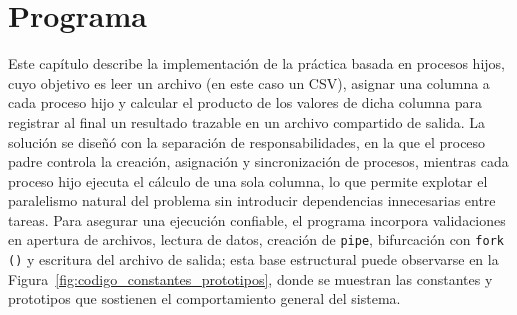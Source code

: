 %


\chapter{Programa}


Este capítulo describe la implementación de la práctica basada en procesos hijos, cuyo objetivo es leer un archivo (en este caso un CSV), asignar una columna a cada proceso hijo y calcular el producto de los valores de dicha columna para registrar al final un resultado trazable en un archivo compartido de salida. La solución se diseñó con la separación de responsabilidades, en la que el proceso padre controla la creación, asignación y sincronización de procesos, mientras cada proceso hijo ejecuta el cálculo de una sola columna, lo que permite explotar el paralelismo natural del problema sin introducir dependencias innecesarias entre tareas. Para asegurar una ejecución confiable, el programa incorpora validaciones en apertura de archivos, lectura de datos, creación de \texttt{pipe}, bifurcación con \texttt{fork ()} y escritura del archivo de salida; esta base estructural puede observarse en la Figura~\ref{fig:codigo_constantes_prototipos}, donde se muestran las constantes y prototipos que sostienen el comportamiento general del sistema.

